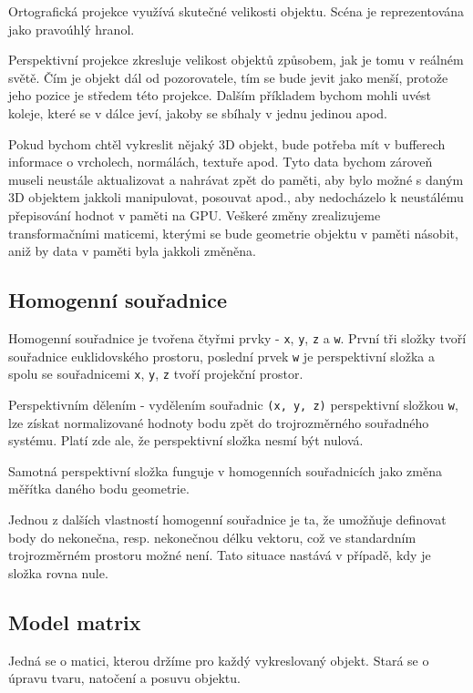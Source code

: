 Ortografická projekce využívá skutečné velikosti objektu. Scéna je reprezentována jako pravoúhlý hranol.

Perspektivní projekce zkresluje velikost objektů způsobem, jak je tomu v reálném světě. Čím je objekt dál od pozorovatele, tím se bude jevit jako menší, protože jeho pozice je středem této projekce. Dalším příkladem bychom mohli uvést koleje, které se v dálce jeví, jakoby se sbíhaly v jednu jedinou apod.
  
Pokud bychom chtěl vykreslit nějaký 3D objekt, bude potřeba mít v bufferech informace o vrcholech, normálách, textuře apod. Tyto data bychom zároveň museli neustále aktualizovat a nahrávat zpět do paměti, aby bylo možné s daným 3D objektem jakkoli manipulovat, posouvat apod., aby nedocházelo k neustálému přepisování hodnot v paměti na GPU. Veškeré změny zrealizujeme transformačními maticemi, kterými se bude geometrie objektu v paměti násobit, aniž by data v paměti byla jakkoli změněna.

\subsection{Homogenní souřadnice}
Homogenní souřadnice je tvořena čtyřmi prvky - \texttt{x}, \texttt{y}, \texttt{z} a \texttt{w}. První tři složky tvoří souřadnice euklidovského prostoru, poslední prvek \texttt{w} je perspektivní složka a spolu se souřadnicemi \texttt{x}, \texttt{y}, \texttt{z} tvoří projekční prostor.\cite{WebGLbeg}

Perspektivním dělením - vydělením souřadnic \texttt{(x, y, z)} perspektivní složkou \texttt{w}, lze získat normalizované hodnoty bodu zpět do trojrozměrného souřadného systému. Platí zde ale, že perspektivní složka nesmí být nulová. 

Samotná perspektivní složka funguje v homogenních souřadnicích jako změna měřítka daného bodu geometrie.

Jednou z dalších vlastností homogenní souřadnice je ta, že umožňuje definovat body do nekonečna, resp. nekonečnou délku vektoru, což ve standardním trojrozměrném prostoru možné není. Tato situace nastává v případě, kdy je složka rovna nule.

\subsection{Model matrix}
Jedná se o matici, kterou držíme pro každý vykreslovaný objekt. Stará se o úpravu tvaru, natočení a posuvu objektu.

